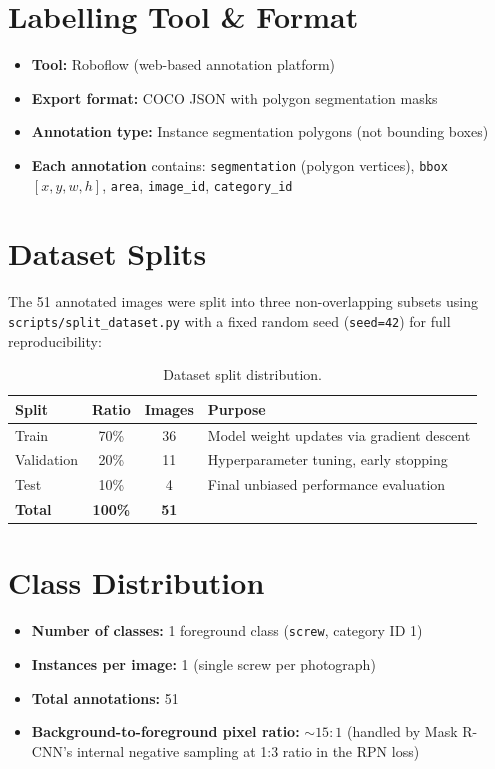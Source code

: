 \documentclass[12pt, a4paper, twoside]{report}
\begin{document}
\section{Labelling Tool \& Format}
\begin{itemize}
    \item \textbf{Tool:} Roboflow (web-based annotation platform)
    \item \textbf{Export format:} COCO JSON with polygon segmentation masks
    \item \textbf{Annotation type:} Instance segmentation polygons (not bounding boxes)
    \item \textbf{Each annotation} contains: \texttt{segmentation} (polygon vertices), \texttt{bbox} $[x, y, w, h]$, \texttt{area}, \texttt{image\_id}, \texttt{category\_id}
\end{itemize}

\section{Dataset Splits}
The 51 annotated images were split into three non-overlapping subsets using \texttt{scripts/split\_dataset.py} with a fixed random seed (\texttt{seed=42}) for full reproducibility:

\begin{table}[H]
\centering
\caption{Dataset split distribution.}
\label{tab:splits}
\begin{tabular}{lccl}
\toprule
\textbf{Split} & \textbf{Ratio} & \textbf{Images} & \textbf{Purpose} \\
\midrule
Train      & 70\% & 36 & Model weight updates via gradient descent \\
Validation & 20\% & 11 & Hyperparameter tuning, early stopping \\
Test       & 10\% &  4 & Final unbiased performance evaluation \\
\midrule
\textbf{Total} & \textbf{100\%} & \textbf{51} & \\
\bottomrule
\end{tabular}
\end{table}

\section{Class Distribution}
\begin{itemize}
    \item \textbf{Number of classes:} 1 foreground class (\texttt{screw}, category ID 1)
    \item \textbf{Instances per image:} 1 (single screw per photograph)
    \item \textbf{Total annotations:} 51
    \item \textbf{Background-to-foreground pixel ratio:} $\sim 15:1$ (handled by Mask R-CNN's internal negative sampling at 1:3 ratio in the RPN loss)
\end{itemize}
\end{document}
